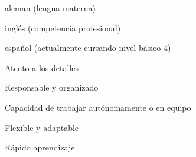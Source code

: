 \newline

\begin{cvparagraph}
  \begin{cvitems}
    \item aleman (lengua materna)
    \item inglés (competencia profesional)
    \item español (actualmente cursando nivel básico 4)
    \end{cvitems}
\end{cvparagraph}

\newline

\begin{cvparagraph}
\begin{cvitems}
  \item Atento a los detalles
  \item Responsable y organizado
  \item Capacidad de trabajar autónomamente o en equipo
  \item Flexible y adaptable
  \item Rápido aprendizaje
\end{cvitems}
\end{cvparagraph}



